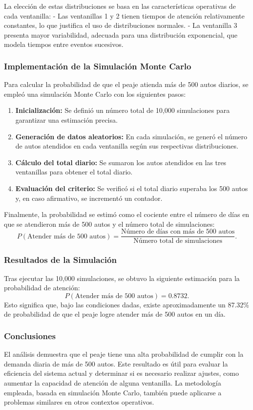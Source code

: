 \documentclass[12pt]{article}
\begin{document}
La elección de estas distribuciones se basa en las características operativas de cada ventanilla:
- Las ventanillas 1 y 2 tienen tiempos de atención relativamente constantes, lo que justifica el uso de distribuciones normales.
- La ventanilla 3 presenta mayor variabilidad, adecuada para una distribución exponencial, que modela tiempos entre eventos sucesivos.

\subsubsection{Implementación de la Simulación Monte Carlo}
Para calcular la probabilidad de que el peaje atienda más de 500 autos diarios, se empleó una simulación Monte Carlo con los siguientes pasos:
\begin{enumerate}
    \item \textbf{Inicialización:} Se definió un número total de 10,000 simulaciones para garantizar una estimación precisa.
    \item \textbf{Generación de datos aleatorios:} En cada simulación, se generó el número de autos atendidos en cada ventanilla según sus respectivas distribuciones.
    \item \textbf{Cálculo del total diario:} Se sumaron los autos atendidos en las tres ventanillas para obtener el total diario.
    \item \textbf{Evaluación del criterio:} Se verificó si el total diario superaba los 500 autos y, en caso afirmativo, se incrementó un contador.
\end{enumerate}

Finalmente, la probabilidad se estimó como el cociente entre el número de días en que se atendieron más de 500 autos y el número total de simulaciones:
\[
P(\text{Atender más de 500 autos}) = \frac{\text{Número de días con más de 500 autos}}{\text{Número total de simulaciones}}.
\]

\subsubsection{Resultados de la Simulación}
Tras ejecutar las 10,000 simulaciones, se obtuvo la siguiente estimación para la probabilidad de atención:
\[
P(\text{Atender más de 500 autos}) = 0.8732.
\]
Esto significa que, bajo las condiciones dadas, existe aproximadamente un 87.32\% de probabilidad de que el peaje logre atender más de 500 autos en un día.

\subsubsection*{Conclusiones}
El análisis demuestra que el peaje tiene una alta probabilidad de cumplir con la demanda diaria de más de 500 autos. Este resultado es útil para evaluar la eficiencia del sistema actual y determinar si es necesario realizar ajustes, como aumentar la capacidad de atención de alguna ventanilla. La metodología empleada, basada en simulación Monte Carlo, también puede aplicarse a problemas similares en otros contextos operativos.
\end{document}
